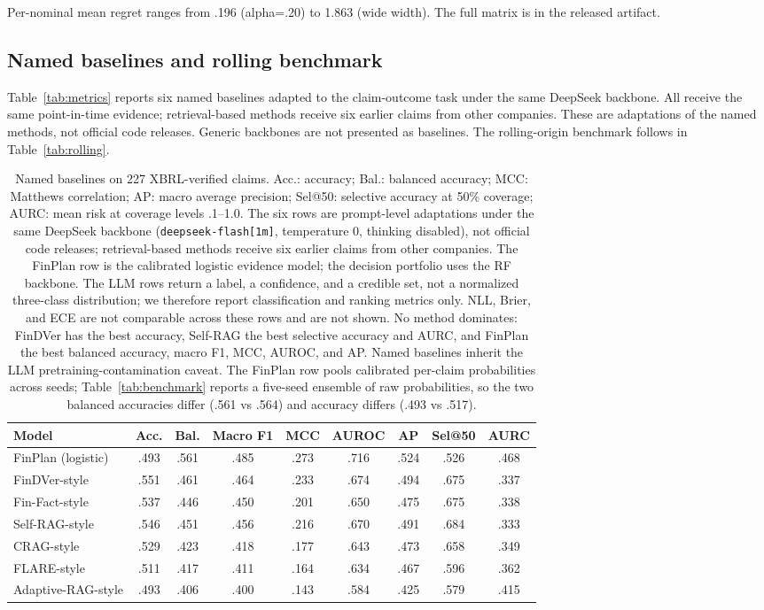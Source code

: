 \documentclass[11pt]{article}
\begin{document}
Per-nominal mean regret ranges from .196 (alpha=.20) to 1.863 (wide width). The full matrix is in the released artifact.

\subsection{Named baselines and rolling benchmark}
\label{app:baselines}
Table~\ref{tab:metrics} reports six named baselines adapted to the claim-outcome
task under the same DeepSeek backbone. All receive the same point-in-time
evidence; retrieval-based methods receive six earlier claims from other
companies. These are adaptations of the named methods, not official code
releases. Generic backbones are not presented as baselines. The rolling-origin
benchmark follows in Table~\ref{tab:rolling}.

\begin{table}[t]
\centering
\small
\setlength{\tabcolsep}{3pt}
\begin{tabular}{lcccccccc}
\toprule
Model & Acc. & Bal. & Macro F1 & MCC & AUROC & AP & Sel@50 & AURC \\
\midrule
FinPlan (logistic) & .493 & .561 & .485 & .273 & .716 & .524 & .526 & .468 \\
FinDVer-style & .551 & .461 & .464 & .233 & .674 & .494 & .675 & .337 \\
Fin-Fact-style & .537 & .446 & .450 & .201 & .650 & .475 & .675 & .338 \\
Self-RAG-style & .546 & .451 & .456 & .216 & .670 & .491 & .684 & .333 \\
CRAG-style & .529 & .423 & .418 & .177 & .643 & .473 & .658 & .349 \\
FLARE-style & .511 & .417 & .411 & .164 & .634 & .467 & .596 & .362 \\
Adaptive-RAG-style & .493 & .406 & .400 & .143 & .584 & .425 & .579 & .415 \\
\bottomrule
\end{tabular}
\caption{Named baselines on 227 XBRL-verified claims. Acc.: accuracy; Bal.: balanced accuracy; MCC: Matthews correlation; AP: macro average precision; Sel@50: selective accuracy at 50\% coverage; AURC: mean risk at coverage levels .1--1.0. The six rows are prompt-level adaptations under the same DeepSeek backbone (\texttt{deepseek-flash[1m]}, temperature 0, thinking disabled), not official code releases; retrieval-based methods receive six earlier claims from other companies. The FinPlan row is the calibrated logistic evidence model; the decision portfolio uses the RF backbone. The LLM rows return a label, a confidence, and a credible set, not a normalized three-class distribution; we therefore report classification and ranking metrics only. NLL, Brier, and ECE are not comparable across these rows and are not shown. No method dominates: FinDVer has the best accuracy, Self-RAG the best selective accuracy and AURC, and FinPlan the best balanced accuracy, macro F1, MCC, AUROC, and AP. Named baselines inherit the LLM pretraining-contamination caveat. The FinPlan row pools calibrated per-claim probabilities across seeds; Table~\ref{tab:benchmark} reports a five-seed ensemble of raw probabilities, so the two balanced accuracies differ (.561 vs .564) and accuracy differs (.493 vs .517).}

\end{table}
\end{document}
